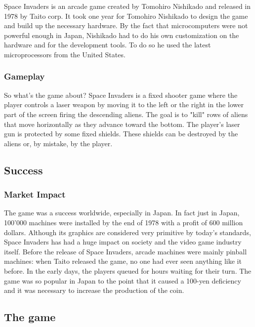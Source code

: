 \documentclass[a4paper,10pt]{book}
\begin{document}
                Space Invaders is an arcade game created by Tomohiro Nishikado and released in 1978 by Taito corp.   It took one year for Tomohiro Nishikado to design the game and build up the necessary hardware. By the fact that microcomputers were
                not powerful enough in Japan, Nishikado had to do his own customization on the hardware and for the development tools. To do so he used the latest microprocessors from the United States.  
 \subsubsection{Gameplay }
   \textbf{}   \textit{}
 
                So what's the game about?   Space Invaders is a fixed shooter game where the player controls a laser weapon by moving it to the left or the right in the lower part of the screen firing the descending aliens. The goal is to "kill" rows
                of aliens that move horizontally as they advance toward the bottom. The player's laser gun is protected by some fixed shields. These shields can be destroyed by the aliens or, by mistake, by the player.
             
 
 \subsection{Success }
 \subsubsection{Market Impact }
            The game was a success worldwide, especially in Japan.   In fact just in Japan, 100'000 machines were installed by the end of 1978 with a profit of 600 million dollars. Although its graphics are considered very primitive by today's standards,
            Space Invaders has had a huge impact on society and the video game industry itself. Before the release of Space Invaders, arcade machines were mainly pinball machines: when Taito released the game, no one had ever seen anything like it before.
            In the early days, the players queued for hours waiting for their turn. The game was so popular in Japan to the point that it caused a 100-yen deficiency and it was necessary to increase the production of the coin.
               \textbf{}   \textit{}
 
 \subsection{The game }
 
\end{document}
